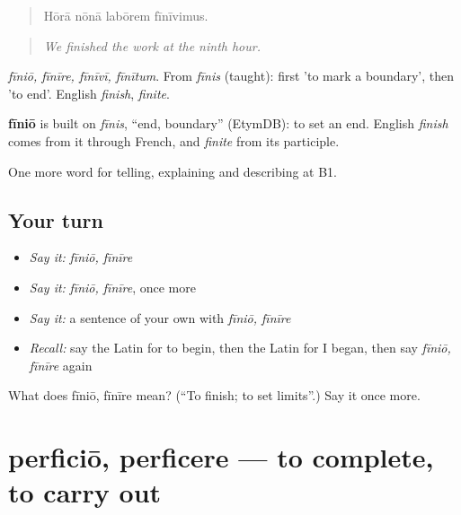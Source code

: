 \begin{quote}
Hōrā nōnā labōrem fīnīvimus.
\end{quote}

\begin{quote}
\emph{We finished the work at the ninth hour.}
\end{quote}

\emph{fīniō, fīnīre, fīnīvī, fīnītum}. From \emph{fīnis} (taught): first 'to mark a boundary', then 'to end'. English \emph{finish}, \emph{finite}.

\begin{cousinweb}
\textbf{fīniō} is built on \emph{fīnis}, \textquotedblleft{}end, boundary\textquotedblright{} (EtymDB): to set an end. English \emph{finish} comes from it through French, and \emph{finite} from its participle.
\end{cousinweb}

\begin{grammarlens}[title={What you've built}]
One more word for telling, explaining and describing at B1.
\end{grammarlens}

\subsection*{Your turn}
\begin{itemize}
\raggedright
  \item \emph{Say it:} \emph{fīniō, fīnīre}
  \item \emph{Say it:} \emph{fīniō, fīnīre}, once more
  \item \emph{Say it:} a sentence of your own with \emph{fīniō, fīnīre}
  \item \emph{Recall:} say the Latin for to begin, then the Latin for I began, then say \emph{fīniō, fīnīre} again
\end{itemize}

\begin{tcolorbox}[breakable,colback=teal!4,colframe=teal!35!black,title={Before you move on}]
What does fīniō, fīnīre mean? (\textquotedblleft{}To finish; to set limits\textquotedblright{}.) Say it once more.
\end{tcolorbox}
\section[perficiō, perficere]{perficiō, perficere — to complete, to carry out}

\label{lesson:LA-C297-perficio}



